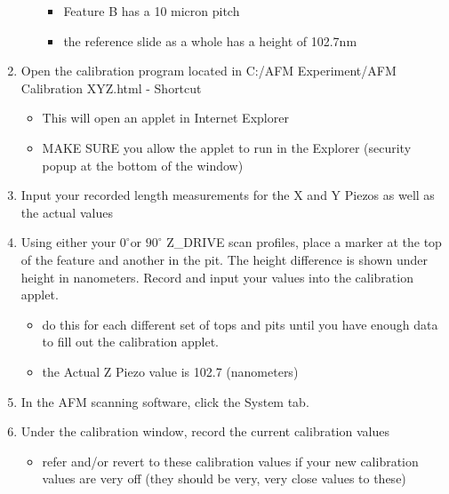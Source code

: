 \documentclass{../lab}
\begin{document}
\begin{enumerate}
\begin{itemize}
\begin{itemize}
            \item Feature B has a 10 micron pitch

            \item the reference slide as a whole has a height of 102.7nm

        \end{itemize}

    \end{itemize}

    \item Open the calibration program located in C:/AFM Experiment/AFM Calibration XYZ.html - Shortcut

    \begin{itemize}
        \item This will open an applet in Internet Explorer

        \item MAKE SURE you allow the applet to run in the Explorer (security popup at the bottom of the window)

    \end{itemize}

    \item Input your recorded length measurements for the X and Y Piezos as well as the actual values

    \item Using either your $0^\circ$or $90^\circ$ Z\_DRIVE scan profiles, place a marker at the top of the feature and another in the pit.  The height difference is shown under height in nanometers. Record and input your values into the calibration applet.

    \begin{itemize}
        \item do this for each different set of tops and pits until you have enough data to fill out the calibration applet.

        \item the Actual Z Piezo value is 102.7 (nanometers)

    \end{itemize}

    \item In the AFM scanning software, click the System tab.

    \item Under the calibration window, record the current calibration values

    \begin{itemize}
        \item refer and/or revert to these calibration values if your new calibration values are very off (they should be very, very close values to these)


\end{itemize}
\end{enumerate}
\end{document}
